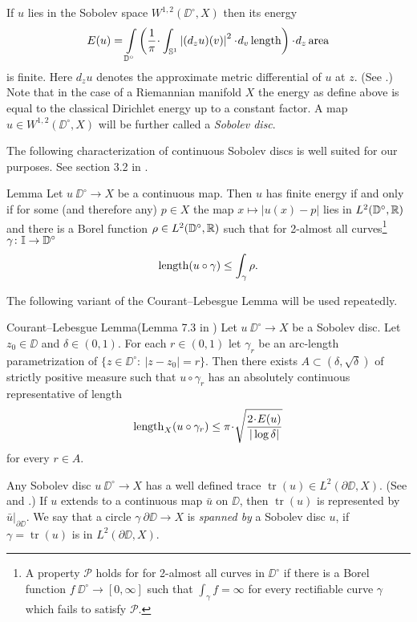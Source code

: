 \documentclass{article}
\begin{document}
If $u$ lies in the Sobolev space $W^{1,2}(\DD^\circ,X)$ then its energy 
\[E(u)=
\int\limits_{\DD^\circ}\left(\frac{1}{\pi}\cdot\int_{\mathbb{S}^1}\left|(d_zu)(v)\right|^2\cdot d_v\length\right)\cdot d_z\area\]
is finite. 
Here $d_zu$ denotes the approximate metric differential of $u$ at $z$. (See \cite{LW}.)
Note that in the case of a Riemannian manifold $X$ the energy as define above is equal to
the classical Dirichlet energy up to a constant factor.
A map $u\in W^{1,2}(\DD^\circ,X)$ will be further called a \emph{Sobolev disc}.

The following characterization of continuous Sobolev discs is well suited for our purposes.
See section 3.2 in \cite{LW3}.


\begin{thm}{Lemma}\label{lem:sobolevchar}
Let $u\:\DD^\circ\to X$ be a continuous map. Then $u$ has finite energy if and only if
for some (and therefore any) $p\in X$ the map $x\mapsto|u(x)-p|$ lies in $L^2(\mathbb{D}^\circ,\mathbb{R})$ and
there is a Borel function $\rho\in L^2(\mathbb{D}^\circ,\mathbb{R})$ such that for 2-almost all curves\footnote{A property $\mathcal{P}$ holds for 
for 2-almost all curves in $\DD^\circ$ if there is a Borel function $f\:\DD^\circ\to[0,\infty]$ such that $\int_\gamma f=\infty$
for every rectifiable curve $\gamma$ which fails to satisfy $\mathcal{P}$.} $\gamma\colon\mathbb{I}\to \mathbb{D}^\circ$
$$
\length(u\circ \gamma)\leq\int_\gamma \rho.%
$$
\end{thm}


The following variant of the Courant--Lebesgue Lemma will be used repeatedly.

\begin{thm}{Courant--Lebesgue Lemma}(Lemma 7.3 in \cite{LW})\label{lem:CL}
Let $u\:\DD^\circ\to X$ be a Sobolev disc. 
Let $z_0\in\DD$ and $\delta\in(0,1)$. 
For each $r\in(0,1)$ let $\gamma_r$ be an arc-length parametrization of $\{z\in \DD^\circ:\ |z-z_0|=r\}$. 
Then there exists $A\subset (\delta,\sqrt{\delta})$ of strictly positive measure such that $u\circ\gamma_r$
has an absolutely continuous representative of length
$$
\length_X(u\circ\gamma_r)
\leq
\pi\cdot\sqrt{\frac{2\cdot E(u)}{|\log\delta|}}
$$
for every $r\in A$.
\end{thm}






Any Sobolev disc $u\:\DD^\circ\to X$ has a well defined trace $\operatorname{tr}(u)\in L^2(\partial\DD,X)$. (See \cite{KS} and \cite{LW}.)
If $u$ extends to a continuous map $\bar u$ on $\DD$, then $\operatorname{tr}(u)$ is represented by $\bar u|_{\partial\DD}$. 
We say that a circle $\gamma\:\partial\DD\to X$ is {\em spanned by} a Sobolev disc $u$, if $\gamma=\operatorname{tr}(u)$ is in 
$L^2(\partial\DD,X)$.
\end{document}
